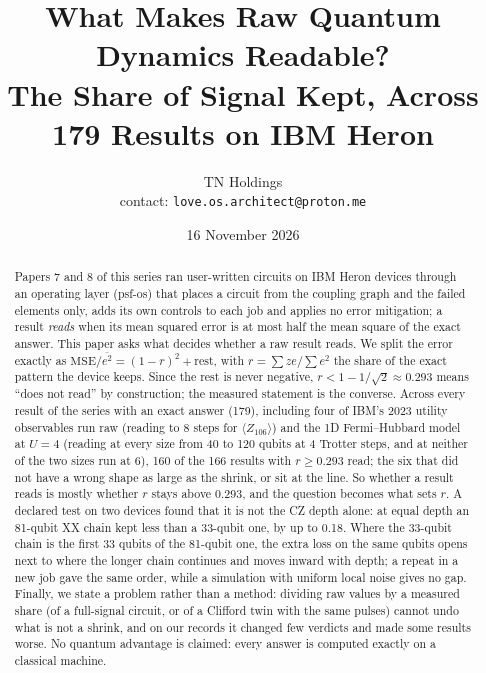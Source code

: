 \documentclass[10pt,a4paper]{article}
\title{What Makes Raw Quantum Dynamics Readable?\\ The Share of Signal Kept, Across 179 Results on IBM Heron}
\author{TN Holdings\\ \small contact: \texttt{love.os.architect@proton.me}}
\date{16 November 2026}
\begin{document}
\maketitle

\begin{abstract}
Papers 7 and 8 of this series ran user-written circuits on IBM Heron devices through an operating layer (psf-os) that
places a circuit from the coupling graph and the failed elements only, adds its own controls to each job and applies
no error mitigation; a result \emph{reads} when its mean squared error is at most half the mean square of the exact
answer. This paper asks what decides whether a raw result reads. We split the error exactly as
$\mathrm{MSE}/\overline{e^2} = (1-r)^2 + \text{rest}$, with $r = \sum ze/\sum e^2$ the share of the exact pattern the
device keeps. Since the rest is never negative, $r < 1 - 1/\sqrt2 \approx 0.293$ means ``does not read'' by
construction; the measured statement is the converse. Across every result of the series with an exact answer (179),
including four of IBM's 2023 utility observables run raw (reading to 8 steps for $\langle Z_{106}\rangle$) and the 1D
Fermi--Hubbard model at $U = 4$ (reading at every size from 40 to 120 qubits at 4 Trotter steps, and at neither of the two sizes run at 6), 160 of
the 166 results with $r \ge 0.293$ read; the six that did not have a wrong shape as large as the shrink, or sit at the
line. So whether a result reads is mostly whether $r$ stays above 0.293, and the question becomes what sets $r$.
A declared test on two devices found that it is not the CZ depth alone: at equal depth an 81-qubit XX chain kept less
than a 33-qubit one, by up to 0.18. Where the 33-qubit chain is the first 33 qubits of the 81-qubit one, the extra loss
on the same qubits opens next to where the longer chain continues and moves inward with depth; a repeat in a new job
gave the same order, while a simulation with uniform local noise gives no gap. Finally, we state a problem rather than a
method: dividing raw values by a measured share (of a full-signal circuit, or of a Clifford twin with the same pulses)
cannot undo what is not a shrink, and on our records it changed few verdicts and made some results worse. No quantum
advantage is claimed: every answer is computed exactly on a classical machine.
\end{abstract}
\end{document}
